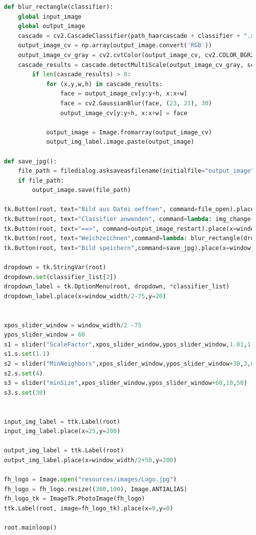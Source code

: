 \documentclass{article}
\begin{document}
\begin{lstlisting}[language=Python]
def blur_rectangle(classifier):
	global input_image
	global output_image
	cascade = cv2.CascadeClassifier(path_haarcascade + classifier + ".xml")
	output_image_cv = np.array(output_image.convert('RGB'))
	output_image_cv_gray = cv2.cvtColor(output_image_cv, cv2.COLOR_BGR2GRAY)
	cascade_results = cascade.detectMultiScale(output_image_cv_gray, scaleFactor=s1.get_val(), minNeighbors = s2.get_val(), minSize=(s3.get_val(), s3.get_val()))
		if len(cascade_results) > 0:
			for (x,y,w,h) in cascade_results:
				face = output_image_cv[y:y+h, x:x+w]
				face = cv2.GaussianBlur(face, (23, 23), 30)
				output_image_cv[y:y+h, x:x+w] = face

			output_image = Image.fromarray(output_image_cv)
			output_img_label.image.paste(output_image)

def save_jpg():
	file_path = filedialog.asksaveasfilename(initialfile="output_image", filetypes=(("jpg files", "*.jpg"),("png files", "*.png")), defaultextension=".jpeg")
	if file_path:
		output_image.save(file_path)

tk.Button(root, text="Bild aus Datei oeffnen", command=file_open).place(x=window_width/2-window_width/4,y=150)
tk.Button(root, text="Classifier anwenden", command=lambda: img_change(dropdown.get())).place(x=window_width/2+window_width/4,y=150)
tk.Button(root, text="==>", command=output_image_restart).place(x=window_width/2-12.5,y=window_height/2)
tk.Button(root, text="Weichzeichnen",command=lambda: blur_rectangle(dropdown.get())).place(x=window_width/2+window_width/4+122,y=150)
tk.Button(root, text="Bild speichern",command=save_jpg).place(x=window_width/2+window_width/4+220,y=150)

dropdown = tk.StringVar(root)
dropdown.set(classifier_list[2])
dropdown_label = tk.OptionMenu(root, dropdown, *classifier_list)
dropdown_label.place(x=window_width/2-75,y=20)


xpos_slider_window = window_width/2 -75
ypos_slider_window = 60
s1 = slider("ScaleFactor",xpos_slider_window,ypos_slider_window,1.01,1.5,float)
s1.s.set(1.1)
s2 = slider("MinNeighbors",xpos_slider_window,ypos_slider_window+30,3,6)
s2.s.set(4)
s3 = slider("minSize",xpos_slider_window,ypos_slider_window+60,10,50)
s3.s.set(30)


input_img_label = ttk.Label(root)
input_img_label.place(x=25,y=200)

output_img_label = ttk.Label(root)
output_img_label.place(x=window_width/2+50,y=200)

fh_logo = Image.open("resources/images/Logo.jpg")
fh_logo = fh_logo.resize((300,100), Image.ANTIALIAS)
fh_logo_tk = ImageTk.PhotoImage(fh_logo)
ttk.Label(root, image=fh_logo_tk).place(x=0,y=0)

root.mainloop()	
\end{lstlisting}


\newpage


\end{document}

